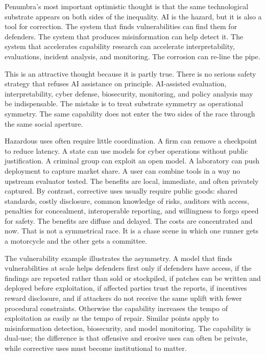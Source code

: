 \documentclass[11pt]{article}
\begin{document}
Penumbra's most important optimistic thought is that the same technological substrate appears on both sides of the inequality. AI is the hazard, but it is also a tool for correction. The system that finds vulnerabilities can find them for defenders. The system that produces misinformation can help detect it. The system that accelerates capability research can accelerate interpretability, evaluations, incident analysis, and monitoring. The corrosion can re-line the pipe.

This is an attractive thought because it is partly true. There is no serious safety strategy that refuses AI assistance on principle. AI-assisted evaluation, interpretability, cyber defense, biosecurity, monitoring, and policy analysis may be indispensable. The mistake is to treat substrate symmetry as operational symmetry. The same capability does not enter the two sides of the race through the same social aperture.

Hazardous uses often require little coordination. A firm can remove a checkpoint to reduce latency. A state can use models for cyber operations without public justification. A criminal group can exploit an open model. A laboratory can push deployment to capture market share. A user can combine tools in a way no upstream evaluator tested. The benefits are local, immediate, and often privately captured. By contrast, corrective uses usually require public goods: shared standards, costly disclosure, common knowledge of risks, auditors with access, penalties for concealment, interoperable reporting, and willingness to forgo speed for safety. The benefits are diffuse and delayed. The costs are concentrated and now. That is not a symmetrical race. It is a chase scene in which one runner gets a motorcycle and the other gets a committee.

The vulnerability example illustrates the asymmetry. A model that finds vulnerabilities at scale helps defenders first only if defenders have access, if the findings are reported rather than sold or stockpiled, if patches can be written and deployed before exploitation, if affected parties trust the reports, if incentives reward disclosure, and if attackers do not receive the same uplift with fewer procedural constraints. Otherwise the capability increases the tempo of exploitation as easily as the tempo of repair. Similar points apply to misinformation detection, biosecurity, and model monitoring. The capability is dual-use; the difference is that offensive and erosive uses can often be private, while corrective uses must become institutional to matter.
\end{document}
